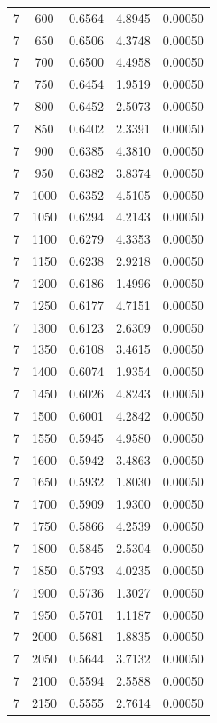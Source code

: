 \begin{longtable}{ccccc}
    7 & 600 & 0.6564 & 4.8945 & 0.00050 \\
    7 & 650 & 0.6506 & 4.3748 & 0.00050 \\
    7 & 700 & 0.6500 & 4.4958 & 0.00050 \\
    7 & 750 & 0.6454 & 1.9519 & 0.00050 \\
    7 & 800 & 0.6452 & 2.5073 & 0.00050 \\
    7 & 850 & 0.6402 & 2.3391 & 0.00050 \\
    7 & 900 & 0.6385 & 4.3810 & 0.00050 \\
    7 & 950 & 0.6382 & 3.8374 & 0.00050 \\
    7 & 1000 & 0.6352 & 4.5105 & 0.00050 \\
    7 & 1050 & 0.6294 & 4.2143 & 0.00050 \\
    7 & 1100 & 0.6279 & 4.3353 & 0.00050 \\
    7 & 1150 & 0.6238 & 2.9218 & 0.00050 \\
    7 & 1200 & 0.6186 & 1.4996 & 0.00050 \\
    7 & 1250 & 0.6177 & 4.7151 & 0.00050 \\
    7 & 1300 & 0.6123 & 2.6309 & 0.00050 \\
    7 & 1350 & 0.6108 & 3.4615 & 0.00050 \\
    7 & 1400 & 0.6074 & 1.9354 & 0.00050 \\
    7 & 1450 & 0.6026 & 4.8243 & 0.00050 \\
    7 & 1500 & 0.6001 & 4.2842 & 0.00050 \\
    7 & 1550 & 0.5945 & 4.9580 & 0.00050 \\
    7 & 1600 & 0.5942 & 3.4863 & 0.00050 \\
    7 & 1650 & 0.5932 & 1.8030 & 0.00050 \\
    7 & 1700 & 0.5909 & 1.9300 & 0.00050 \\
    7 & 1750 & 0.5866 & 4.2539 & 0.00050 \\
    7 & 1800 & 0.5845 & 2.5304 & 0.00050 \\
    7 & 1850 & 0.5793 & 4.0235 & 0.00050 \\
    7 & 1900 & 0.5736 & 1.3027 & 0.00050 \\
    7 & 1950 & 0.5701 & 1.1187 & 0.00050 \\
    7 & 2000 & 0.5681 & 1.8835 & 0.00050 \\
    7 & 2050 & 0.5644 & 3.7132 & 0.00050 \\
    7 & 2100 & 0.5594 & 2.5588 & 0.00050 \\
    7 & 2150 & 0.5555 & 2.7614 & 0.00050 \\

\end{longtable}
